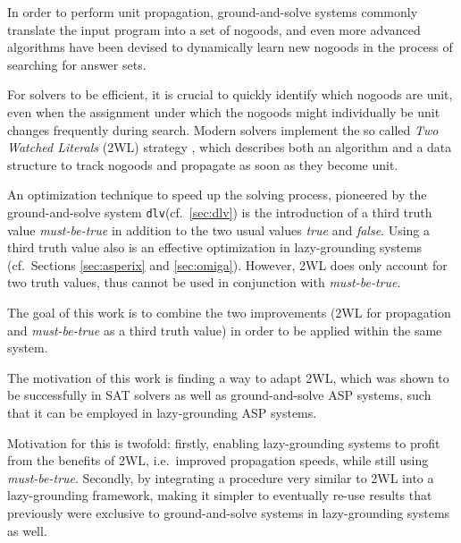 \documentclass{vutinfth} %
\newcommand{\mbt}{must-be-true\xspace}
\newcommand{\dlv}{\texttt{dlv}\xspace}
\begin{document}
In order to perform unit propagation, ground-and-solve systems commonly translate the input program into a set of nogoods, and even more advanced algorithms have been devised to dynamically learn new nogoods in the process of searching for answer sets. 

For solvers to be efficient, it is crucial to quickly identify which nogoods are unit, even when the assignment under which the nogoods might individually be unit changes frequently during search. Modern solvers implement the so called \emph{Two Watched Literals} (2WL) strategy \cite{effsat,questsat}, which describes both an algorithm and a data structure to track nogoods and propagate as soon as they become unit.

An optimization technique to speed up the solving process, pioneered by the ground-and-solve system \dlv (cf.~\ref{sec:dlv}) is the introduction of a third truth value \emph{\mbt} in addition to the two usual values \emph{true} and \emph{false}. Using a third truth value also is an effective optimization in lazy-grounding systems (cf.~Sections \ref{sec:asperix} and \ref{sec:omiga}). However, 2WL does only account for two truth values, thus cannot be used in conjunction with \emph{\mbt}.

The goal of this work is to combine the two improvements (2WL for propagation and \emph{\mbt} as a third truth value) in order to be applied within the same system.

The motivation of this work is finding a way to adapt 2WL, which was shown to be successfully in SAT solvers as well as ground-and-solve ASP systems, such that it can be employed in lazy-grounding ASP systems.

Motivation for this is twofold: firstly, enabling lazy-grounding systems to profit from the benefits of 2WL, i.e.~improved propagation speeds, while still using \emph{\mbt}. Secondly, by integrating a procedure very similar to 2WL into a lazy-grounding framework, making it simpler to eventually re-use results that previously were exclusive to ground-and-solve systems in lazy-grounding systems as well.


\end{document}
